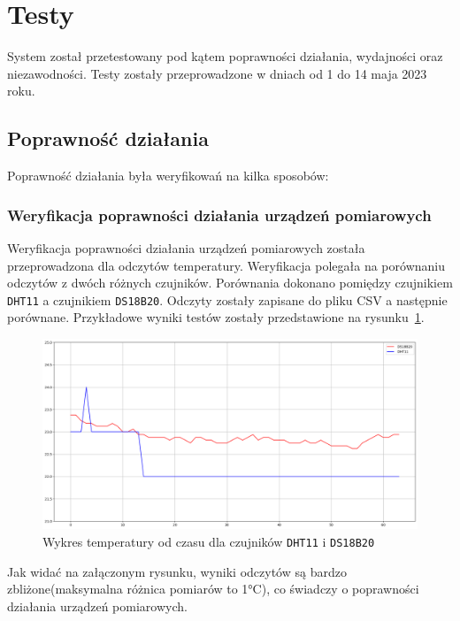 \section{Testy}
System został przetestowany pod kątem poprawności działania, wydajności oraz niezawodności. Testy zostały przeprowadzone w dniach od 1 do 14 maja 2023 roku.

\subsection{Poprawność działania}
Poprawność działania była weryfikowań na kilka sposobów:

\subsubsection{Weryfikacja poprawności działania urządzeń pomiarowych}

Weryfikacja poprawności działania urządzeń pomiarowych została przeprowadzona dla
odczytów temperatury. Weryfikacja polegała na porównaniu odczytów z dwóch różnych czujników. Porównania dokonano pomiędzy czujnikiem \texttt{DHT11} a czujnikiem \texttt{DS18B20}. Odczyty zostały zapisane do pliku CSV a następnie porównane. Przykładowe wyniki testów zostały przedstawione na rysunku~\ref{rys:dht-vs-ds}.

\begin{figure}[b!]
    \begin{center}
        \includegraphics[width=15cm]{pic/dht-vs-ds.png}
    \end{center}
    \caption{Wykres temperatury od czasu dla czujników \texttt{DHT11} i \texttt{DS18B20}}\label{rys:dht-vs-ds}
\end{figure}

Jak widać na załączonym rysunku, wyniki odczytów są bardzo zbliżone(maksymalna różnica pomiarów to 1°C), co świadczy o poprawności działania urządzeń pomiarowych.

